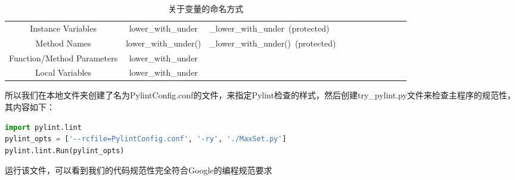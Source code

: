 \documentclass{article}
\begin{document}
\begin{table}[!htbp]
\begin{tabular}{ccccccccccc}
\textcolor[rgb]{0.141, 0.161, 0.180}{Instance Variables} & \textcolor[rgb]{0.141, 0.161, 0.180}{lower\_with\_under} & \multicolumn{1}{l}{\textcolor[rgb]{0.141, 0.161, 0.180}{\_lower\_with\_under (protected)}} \\
\textcolor[rgb]{0.141, 0.161, 0.180}{Method Names} & \textcolor[rgb]{0.141, 0.161, 0.180}{lower\_with\_under()} & \multicolumn{1}{l}{\textcolor[rgb]{0.141, 0.161, 0.180}{\_lower\_with\_under() (protected)}} \\
\textcolor[rgb]{0.141, 0.161, 0.180}{Function/Method Parameters} & \textcolor[rgb]{0.141, 0.161, 0.180}{lower\_with\_under} & \textcolor[rgb]{0.141, 0.161, 0.180}{} \\
\textcolor[rgb]{0.141, 0.161, 0.180}{Local Variables} & \textcolor[rgb]{0.141, 0.161, 0.180}{lower\_with\_under} &  \\
\bottomrule
\end{tabular}
\caption{关于变量的命名方式}
\end{table}
\large
\newpage
所以我们在本地文件夹创建了名为PylintConfig.conf的文件，来指定Pylint检查的样式，然后创建try\_pylint.py文件来检查主程序的规范性，其内容如下：
\begin{lstlisting}[language = python]
import pylint.lint
pylint_opts = ['--rcfile=PylintConfig.conf', '-ry', './MaxSet.py']
pylint.lint.Run(pylint_opts)
\end{lstlisting}
运行该文件，可以看到我们的代码规范性完全符合Google的编程规范要求
\end{document}
